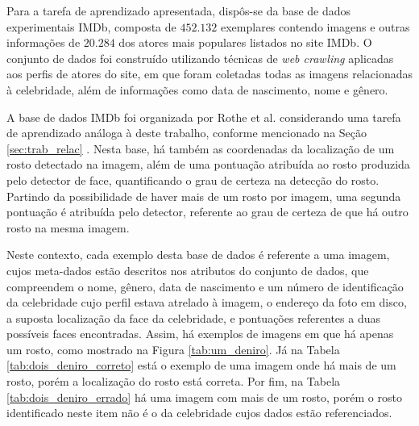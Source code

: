 Para a tarefa de aprendizado apresentada, dispôs-se da base de dados experimentais IMDb, composta de $452.132$ exemplares contendo imagens e outras informações de $20.284$ dos atores mais populares listados no site IMDb. O conjunto de dados foi construído utilizando técnicas de \emph{web crawling} aplicadas aos perfis de atores do site, em que foram coletadas todas as imagens relacionadas à celebridade, além de informações como data de nascimento, nome e gênero. 

A base de dados IMDb foi organizada por Rothe et al. considerando uma tarefa de aprendizado análoga à deste trabalho, conforme mencionado na Seção  \ref{sec:trab_relac} \cite{rothe2015dex}.  Nesta base, há também as coordenadas da localização de um rosto detectado na imagem, além de uma pontuação atribuída ao rosto produzida pelo detector de face, quantificando o grau de certeza na detecção do rosto. Partindo da possibilidade de haver mais de um rosto por imagem, uma segunda pontuação é atribuída pelo detector, referente ao grau de certeza de que há outro rosto na mesma imagem.

Neste contexto, cada exemplo desta base de dados é referente a uma imagem, cujos meta-dados estão descritos nos atributos do conjunto de dados, que compreendem o nome, gênero, data de nascimento e um número de identificação da celebridade cujo perfil estava atrelado à imagem, o endereço da foto em disco, a suposta localização da face da celebridade, e pontuações referentes a duas possíveis faces encontradas. Assim, há exemplos de imagens em que há apenas um rosto, como mostrado na Figura \ref{tab:um_deniro}. Já na Tabela \ref{tab:dois_deniro_correto} está o exemplo de uma imagem onde há mais de um rosto, porém a localização do rosto está correta. Por fim, na Tabela \ref{tab:dois_deniro_errado} há uma imagem com mais de um rosto, porém o rosto identificado neste item não é o da celebridade cujos dados estão referenciados.

